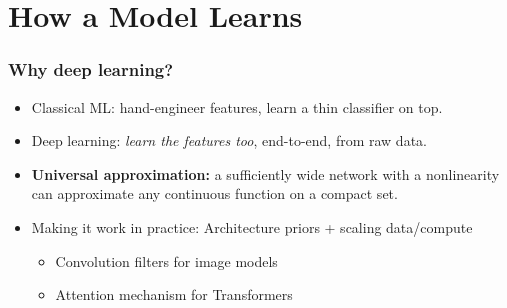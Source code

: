 \section{How a Model Learns}

\begin{frame}
\frametitle{Why deep learning?}
\begin{itemize}
    \item Classical ML: hand-engineer features,
    learn a thin classifier on top.
    \pause
    \item Deep learning: \textit{learn the features too}, end-to-end, from raw data.
    \pause
    \item \textbf{Universal approximation:} a sufficiently wide network with a
    nonlinearity can approximate any continuous function on a compact set.
    \pause
    \item Making it work in practice: Architecture priors + scaling data/compute
    \begin{itemize}
        \item Convolution filters for image models
        \item Attention mechanism for Transformers
    \end{itemize}
\end{itemize}
\end{frame}




